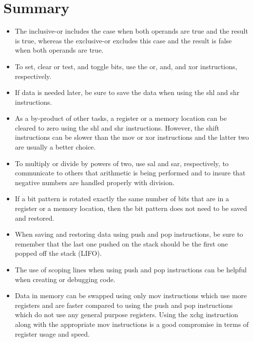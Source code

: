 \documentclass[10pt]{book}
\begin{document}
\section{Summary}
\begin{itemize}
  \item The inclusive-or includes the case when both operands are true and the result is true, whereas the exclusive-or excludes this case and the result is false when both operands are true.
  \item To set, clear or test, and toggle bits, use the or, and, and xor instructions, respectively.
  \item If data is needed later, be sure to save the data when using the shl and shr instructions.
  \item As a by-product of other tasks, a register or a memory location can be cleared to zero using the shl and shr instructions. However, the shift instructions can be slower than the mov or xor instructions and the latter two are usually a better choice.
  \item To multiply or divide by powers of two, use sal and sar, respectively, to communicate to others that arithmetic is being performed and to insure that negative numbers are handled properly with division.
  \item If a bit pattern is rotated exactly the same number of bits that are in a register or a memory location, then the bit pattern does not need to be saved and restored.
  \item When saving and restoring data using push and pop instructions, be sure to remember that the last one pushed on the stack should be the first one popped off the stack (LIFO).
  \item The use of scoping lines when using push and pop instructions can be helpful when creating or debugging code.
  \item Data in memory can be swapped using only mov instructions which use more registers and are faster compared to using the push and pop instructions which do not use any general purpose registers. Using the xchg instruction along with the appropriate mov instructions is a good compromise in terms of register usage and speed.
\end{itemize}
\end{document}
